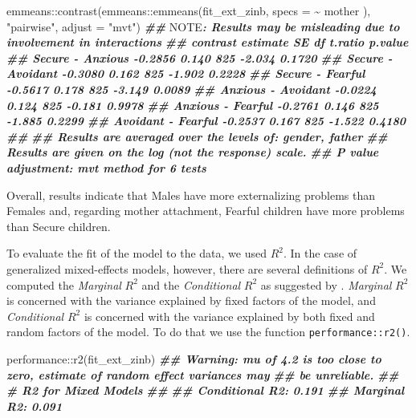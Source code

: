 \documentclass[
]{book}
\newenvironment{Shaded}{\begin{snugshade}}{\end{snugshade}}
\newcommand{\AlertTok}[1]{\textcolor[rgb]{0.94,0.16,0.16}{#1}}
\newcommand{\AttributeTok}[1]{\textcolor[rgb]{0.77,0.63,0.00}{#1}}
\newcommand{\DocumentationTok}[1]{\textcolor[rgb]{0.56,0.35,0.01}{\textbf{\textit{#1}}}}
\newcommand{\FunctionTok}[1]{\textcolor[rgb]{0.00,0.00,0.00}{#1}}
\newcommand{\NormalTok}[1]{#1}
\newcommand{\SpecialCharTok}[1]{\textcolor[rgb]{0.00,0.00,0.00}{#1}}
\newcommand{\StringTok}[1]{\textcolor[rgb]{0.31,0.60,0.02}{#1}}
\begin{document}
\begin{Shaded}
\begin{Highlighting}[]
\NormalTok{emmeans}\SpecialCharTok{::}\FunctionTok{contrast}\NormalTok{(emmeans}\SpecialCharTok{::}\FunctionTok{emmeans}\NormalTok{(fit\_ext\_zinb, }\AttributeTok{specs =} \SpecialCharTok{\textasciitilde{}}\NormalTok{ mother ),}
                  \StringTok{"pairwise"}\NormalTok{, }\AttributeTok{adjust =} \StringTok{"mvt"}\NormalTok{)}
\DocumentationTok{\#\# }\AlertTok{NOTE}\DocumentationTok{: Results may be misleading due to involvement in interactions}
\DocumentationTok{\#\#  contrast           estimate    SE  df t.ratio p.value}
\DocumentationTok{\#\#  Secure {-} Anxious    {-}0.2856 0.140 825  {-}2.034  0.1720}
\DocumentationTok{\#\#  Secure {-} Avoidant   {-}0.3080 0.162 825  {-}1.902  0.2228}
\DocumentationTok{\#\#  Secure {-} Fearful    {-}0.5617 0.178 825  {-}3.149  0.0089}
\DocumentationTok{\#\#  Anxious {-} Avoidant  {-}0.0224 0.124 825  {-}0.181  0.9978}
\DocumentationTok{\#\#  Anxious {-} Fearful   {-}0.2761 0.146 825  {-}1.885  0.2299}
\DocumentationTok{\#\#  Avoidant {-} Fearful  {-}0.2537 0.167 825  {-}1.522  0.4180}
\DocumentationTok{\#\# }
\DocumentationTok{\#\# Results are averaged over the levels of: gender, father }
\DocumentationTok{\#\# Results are given on the log (not the response) scale. }
\DocumentationTok{\#\# P value adjustment: mvt method for 6 tests}
\end{Highlighting}
\end{Shaded}

Overall, results indicate that Males have more externalizing problems than Females and, regarding mother attachment, Fearful children have more problems than Secure children.

To evaluate the fit of the model to the data, we used \(R^2\). In the case of generalized mixed-effects models, however, there are several definitions of \(R^2\). We computed the \emph{Marginal} \(R^2\) and the \emph{Conditional} \(R^2\) as suggested by \citet{nakagawaCoefficientDeterminationR22017}. \emph{Marginal} \(R^2\) is concerned with the variance explained by fixed factors of the model, and \emph{Conditional} \(R^2\) is concerned with the variance explained by both fixed and random factors of the model. To do that we use the function \texttt{performance::r2()}.

\begin{Shaded}
\begin{Highlighting}[]
\NormalTok{performance}\SpecialCharTok{::}\FunctionTok{r2}\NormalTok{(fit\_ext\_zinb)}
\DocumentationTok{\#\# Warning: mu of 4.2 is too close to zero, estimate of random effect variances may}
\DocumentationTok{\#\#   be unreliable.}
\DocumentationTok{\#\# \# R2 for Mixed Models}
\DocumentationTok{\#\# }
\DocumentationTok{\#\#   Conditional R2: 0.191}
\DocumentationTok{\#\#      Marginal R2: 0.091}
\end{Highlighting}
\end{Shaded}
\end{document}
